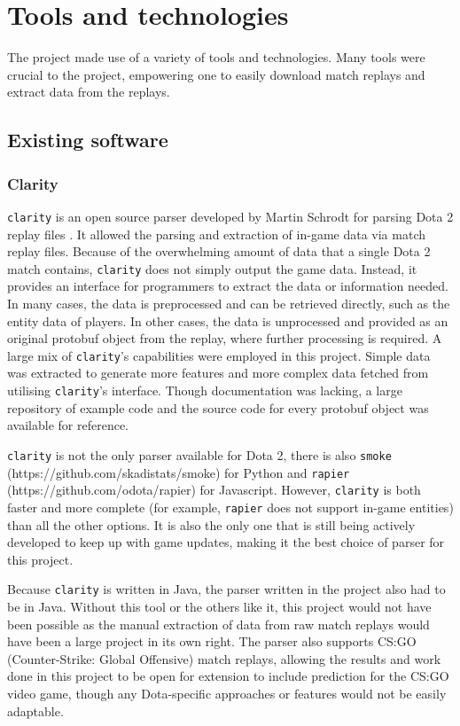 \documentclass[Report.tex]{subfiles}
\begin{document}
\section{Tools and technologies}
The project made use of a variety of tools and technologies. Many tools were crucial to the project, empowering one to easily download match replays and extract data from the replays.

\subsection{Existing software}

\subsubsection{Clarity}
\texttt{clarity} is an open source parser developed by Martin Schrodt for parsing Dota 2 replay files \cite{clarity}. It allowed the parsing and extraction of in-game data via match replay files. Because of the overwhelming amount of data that a single Dota 2 match contains, \texttt{clarity} does not simply output the game data. Instead, it provides an interface for programmers to extract the data or information needed. In many cases, the data is preprocessed and can be retrieved directly, such as the entity data of players. In other cases, the data is unprocessed and provided as an original protobuf object from the replay, where further processing is required. A large mix of \texttt{clarity}'s capabilities were employed in this project. Simple data was extracted to generate more features and more complex data fetched from utilising \texttt{clarity}'s interface. Though documentation was lacking, a large repository of example code and the source code for every protobuf object was available for reference. 

\texttt{clarity} is not the only parser available for Dota 2, there is also \texttt{smoke} (https://github.com/skadistats/smoke) for Python and \texttt{rapier} (https://github.com/odota/rapier) for Javascript. However, \texttt{clarity} is both faster and more complete (for example, \texttt{rapier} does not support in-game entities) than all the other options. It is also the only one that is still being actively developed to keep up with game updates, making it the best choice of parser for this project. 

Because \texttt{clarity} is written in Java, the parser written in the project also had to be in Java. Without this tool or the others like it, this project would not have been possible as the manual extraction of data from raw match replays would have been a large project in its own right. The parser also supports CS:GO (Counter-Strike: Global Offensive) match replays, allowing the results and work done in this project to be open for extension to include prediction for the CS:GO video game, though any Dota-specific approaches or features would not be easily adaptable. 
\end{document}
